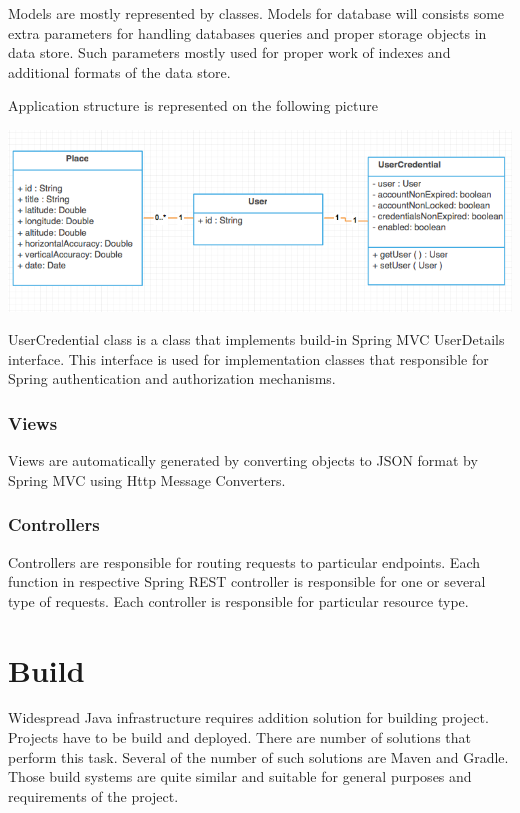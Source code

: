 \documentclass[thesis=M,english]{FITthesis}[2012/10/20]
\begin{document}
Models are mostly represented by classes. Models for database will consists some extra parameters for handling databases queries and proper storage objects in data store. Such parameters mostly used for proper work of indexes and additional formats of the data store.

Application structure is represented on the following picture

\begin{center}
\includegraphics[width=1.0\textwidth]{images/uml/uml_server}
\end{center}

UserCredential class is a class that implements build-in Spring MVC UserDetails interface. This interface is used for implementation classes that responsible for Spring authentication and authorization mechanisms. 

\subsubsection{Views}

Views are automatically generated by converting objects to JSON format by Spring MVC using Http Message Converters. 

\subsubsection{Controllers}

Controllers are responsible for routing requests to particular endpoints. Each function in respective Spring REST controller is responsible for one or several type of requests. Each controller is responsible for particular resource type.



\section{Build}

Widespread Java infrastructure requires addition solution for building project. Projects have to be build and deployed. There are number of solutions that perform this task. Several of the number of such solutions are  Maven and Gradle.
Those build systems are quite similar and suitable for general purposes and requirements of the project.
\end{document}
